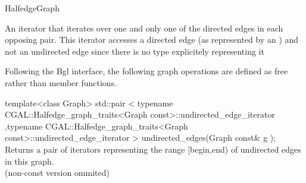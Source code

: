 \begin{ccRefConcept}{HalfedgeGraph}
\ccRefines
{}

\ccTypes
  {An iterator that iterates over one and only one of the directed edges
  in each opposing pair. This iterator accesses a directed edge 
  (as represented by an ) and not an undirected edge 
  since there is no type explicitely representing it}{}
  
\ccOperations

Following the {\sc Bgl} interface, the following graph operations are defined as free rather than member functions.

  \ccFunction
  {template<class Graph>
  std::pair < typename CGAL::Halfedge_graph_traits<Graph const>::undirected_edge_iterator
             ,typename CGAL::Halfedge_graph_traits<Graph const>::undirected_edge_iterator
             >   
  undirected_edges(Graph const& g );
  }
  {Returns a pair of iterators representing the range [begin,end) 
  of undirected edges in this graph.\\
  (non-const version ommited)
  }

\ccHasModels
{}\\
\\

\end{ccRefConcept}

